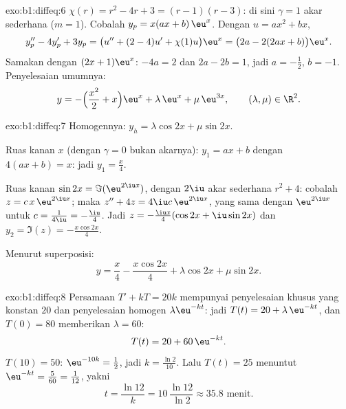\begin{solution}{exo:b1:diffeq:6}
$\chi(r) = r^2 - 4r + 3 = (r-1)(r-3)$: di sini $\gamma = 1$ akar sederhana
($m = 1$). Cobalah $y_p = x(ax + b)\,\eu^x$. Dengan $u = ax^2 + bx$,
\[
y_p'' - 4y_p' + 3y_p = \bigl(u'' + (2 - 4)u' + \chi(1) u\bigr)\eu^x
= \bigl(2a - 2(2ax + b)\bigr)\eu^x .
\]
Samakan dengan $(2x + 1)\eu^x$: $-4a = 2$ dan $2a - 2b = 1$, jadi $a =
-\frac12$, $b = -1$. Penyelesaian umumnya:
\[
y = -\Bigl(\frac{x^2}{2} + x\Bigr)\eu^{x} + \lambda\,\eu^{x} +
\mu\,\eu^{3x}, \qquad (\lambda, \mu) \in \R^2 .
\]
\end{solution}

\begin{solution}{exo:b1:diffeq:7}
Homogennya: $y_h = \lambda\cos 2x + \mu\sin 2x$.

Ruas kanan $x$ (dengan $\gamma = 0$ bukan akarnya): $y_1 = ax + b$ dengan
$4(ax + b) = x$: jadi $y_1 = \frac x4$.

Ruas kanan $\sin 2x = \Im(\eu^{2\iu x})$, dengan $2\iu$ akar sederhana
$r^2 + 4$: cobalah $z = c\,x\,\eu^{2\iu x}$; maka $z'' + 4z =
4\iu c\,\eu^{2\iu x}$, yang sama dengan $\eu^{2\iu x}$ untuk $c =
\frac{1}{4\iu} = -\frac{\iu}{4}$. Jadi $z = -\frac{\iu x}{4}(\cos 2x +
\iu \sin 2x)$ dan $y_2 = \Im(z) = -\frac{x\cos 2x}{4}$.

Menurut superposisi:
\[
y = \frac{x}{4} - \frac{x\cos 2x}{4} + \lambda\cos 2x + \mu\sin 2x .
\]
\end{solution}

\begin{solution}{exo:b1:diffeq:8}
Persamaan $T' + kT = 20k$ mempunyai penyelesaian khusus yang konstan $20$ dan
penyelesaian homogen $\lambda\eu^{-kt}$: jadi $T(t) = 20 +
\lambda\,\eu^{-kt}$, dan $T(0) = 80$ memberikan $\lambda = 60$:
\[
T(t) = 20 + 60\,\eu^{-kt} .
\]
$T(10) = 50$: $\eu^{-10k} = \frac12$, jadi $k = \frac{\ln 2}{10}$. Lalu
$T(t) = 25$ menuntut $\eu^{-kt} = \frac{5}{60} = \frac{1}{12}$, yakni
\[
t = \frac{\ln 12}{k} = 10\,\frac{\ln 12}{\ln 2} \approx 35.8
\text{ menit.}
\]
\end{solution}

